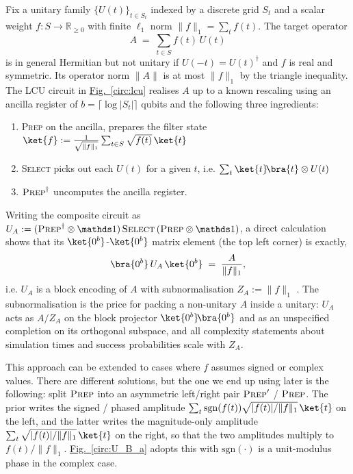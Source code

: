 Fix a unitary family $\{U(t)\}_{t\in S_t}$ indexed by a discrete grid $S_t$ and a scalar weight $f : S \to \mathbb{R}_{\geq 0}$ with finite $\ell_1$ norm $\|f\|_1 = \sum_t f(t)$. The target operator
$$
A \;=\; \sum_{t \in S} f(t)\,U(t)
$$
is in general Hermitian but not unitary if $U(-t) = U(t)^\dagger$ and $f$ is real and symmetric. Its operator norm $\|A\|$ is at most $\|f\|_1$ by the triangle inequality. The LCU circuit in \hyperref[circ:lcu]{Fig.~\ref*{circ:lcu}} realises $A$ up to a known rescaling using an ancilla register of $b = \lceil \log|S_t|\rceil$ qubits and the following three ingredients: 
\begin{enumerate}
    \item \textsc{Prep} on the ancilla, prepares the filter state $\ket{f} := \frac{1}{\sqrt{\|f\|_1}}\sum_{t \in S} \sqrt{f(t)}\,\ket{t}$
    \item \textsc{Select} picks out each $U(t)$ for a given $t$, i.e. $\sum_{t}\ket{t}\!\bra{t}\otimes U(t)$
    \item $\textsc{Prep}^\dagger$ uncomputes the ancilla register.
\end{enumerate}
Writing the composite circuit as $U_A := (\textsc{Prep}^\dagger \otimes \idm)\, \textsc{Select}\, (\textsc{Prep} \otimes \idm)$, a direct calculation shows that its $\ket{0^b}$-$\ket{0^b}$ matrix element (the top left corner) is exactly, 
\begin{equation} \label{eq:lcu}
    \bra{0^b}\,U_A\,\ket{0^b} \;=\; \frac{A}{\|f\|_1},
\end{equation}
i.e. $U_A$ is a block encoding of $A$ with subnormalisation $Z_A := \|f\|_1$ \cite{low2019hamiltonian}. The subnormalisation is the price for packing a non-unitary $A$ inside a unitary: $U_A$ acts as $A / Z_A$ on the block projector $\ket{0^b}\!\bra{0^b}$ and as an unspecified completion on its orthogonal subspace, and all complexity statements about simulation times and success probabilities scale with $Z_A$.

This approach can be extended to cases where $f$ assumes signed or complex values. There are different solutions, but the one we end up using later is the following: split $\textsc{Prep}$ into an asymmetric left/right pair $\textsc{Prep}'$ / $\textsc{Prep}$. The prior writes the signed / phased amplitude $\sum_t \mathrm{sgn}(f(t))\sqrt{|f(t)|/\|f\|_1}\,\ket{t}$ on the left, and the latter writes the magnitude-only amplitude $\sum_t \sqrt{|f(t)|/\|f\|_1}\,\ket{t}$ on the right, so that the two amplitudes multiply to $f(t)/\|f\|_1$. \hyperref[circ:U_B_a]{Fig.~\ref*{circ:U_B_a}} adopts this with $\mathrm{sgn}(\cdot)$ is a unit-modulus phase in the complex case.

